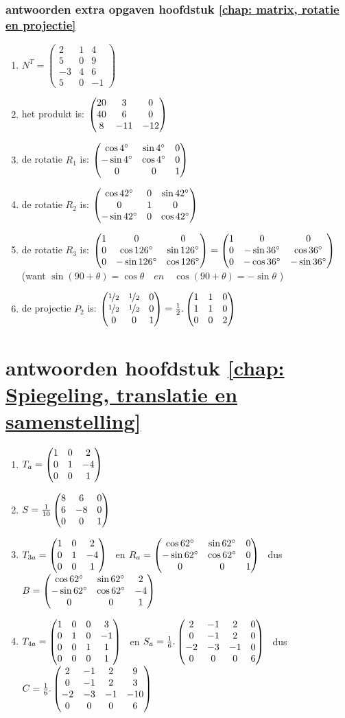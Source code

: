 \subsubsection{antwoorden extra opgaven hoofdstuk \ref{chap: matrix, rotatie en projectie}}
\begin{enumerate}
	\item
	$ N^{T} =	\begin{pmatrix}
	2 & 1 & 4\\
	5&0&9\\
	-3&4&6\\
	5&0&-1 
	\end{pmatrix} $
	\item
	het produkt is:  
	$ \begin{pmatrix} 20&3&0 \\ 40&6&0 \\ 8&-11&-12 \end{pmatrix} $
	\item    de rotatie   \textit{$ R_1  $}  is:  
	$ \begin{pmatrix} \cos  4 \degree  & \sin 4 \degree &0 \\  -\sin 4 \degree & \cos 4 \degree&0 \\ 0&0&1 \end{pmatrix} $
	\item de rotatie   \textit{$ R_2  $}  is:  
	$ \begin{pmatrix} \cos  42 \degree  & 0& \sin 42 \degree  \\ 0&1&0 \\  -\sin 42\degree &  0 &\cos 42 \degree \end{pmatrix} 
	$
	\item     de rotatie \textit{$ R_3  $} is:  
	$ \begin{pmatrix} 1&0&0 \\ 0&\cos  126 \degree  & \sin 126 \degree \\ 0& -\sin 126 \degree & \cos 126 \degree \end{pmatrix}  
	= \begin{pmatrix} 1&0&0 \\ 0&-\sin  36 \degree  & \cos 36 \degree \\ 0& -\cos 36 \degree & -\sin 36 \degree \end{pmatrix}  $ \\
	(want $ \sin(90+\theta)  = \cos \theta \quad en \quad \cos(90+\theta)  = -\sin \theta $ )
	\item   de projectie \textit{ $ P_2 $ } is:  
	$ \begin{pmatrix} \nicefrac{1}{2}&\nicefrac{1}{2}&0 \\ \nicefrac{1}{2}&\nicefrac{1}{2}  & 0 \\ 0& 0 & 1 \end{pmatrix}  
	= \frac{1}{2} .\begin{pmatrix} 1&1&0 \\ 1&1  & 0 \\ 0& 0 & 2 \end{pmatrix} $    
	
\end{enumerate}

\section{antwoorden  hoofdstuk \ref{chap: Spiegeling, translatie en samenstelling}}
\begin{enumerate}
	\item $ T_a = \begin{pmatrix} 1&0&2 \\ 0&1&-4 \\ 0&0&1 \end{pmatrix} $ 
	
	\item $   S = \frac{1}{10} \begin{pmatrix} 8&6&0 \\ 6&-8&0 \\ 0&0&1 \end{pmatrix}  $ 
	
	\item $ T_{3a} = \begin{pmatrix} 1&0&2 \\ 0&1&-4 \\ 0&0&1 \end{pmatrix} $ 
	\ en $ R_a= \begin{pmatrix} \cos 62 \degree &\sin 62 \degree&0 \\ -\sin 62 \degree&\cos 62 \degree&0 \\ 0&0&1 \end{pmatrix} $ 
	\ dus $ B= \begin{pmatrix} \cos 62 \degree &\sin 62 \degree&2 \\ -\sin 62 \degree&\cos 62 \degree&-4 \\ 0&0&1 \end{pmatrix} $ 
	
	
	\item $ T_{4a} = \begin{pmatrix} 1&0&0&3 \\ 0&1&0&-1 \\ 0&0&1&1 \\ 0&0&0&1 \end{pmatrix} $
	\ en $ S_a= \frac{1}{6}.\begin{pmatrix} 2&-1&2&0 \\ 0&-1&2&0 \\ -2&-3&-1&0 \\ 0&0&0&6 \end{pmatrix} $
	\ dus $ C = \frac{1}{6}. \begin{pmatrix} 2&-1&2&9 \\ 0&-1&2&3 \\ -2&-3&-1&-10 \\ 0&0&0&6 \end{pmatrix} $
	
	
\end{enumerate}

